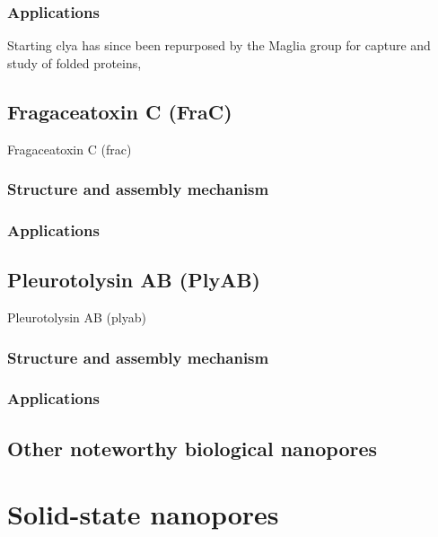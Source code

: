 \subsubsection{Applications}
Starting \gls{clya}  has since been repurposed by the Maglia group for capture and study of folded proteins, 




\subsection{Fragaceatoxin C (FraC)}

Fragaceatoxin C (\gls{frac})

\subsubsection{Structure and assembly mechanism}

\subsubsection{Applications}



\subsection{Pleurotolysin AB (PlyAB)}

Pleurotolysin AB (\gls{plyab})

\subsubsection{Structure and assembly mechanism}

\subsubsection{Applications}



\subsection{Other noteworthy biological nanopores}

\section{Solid-state nanopores}

